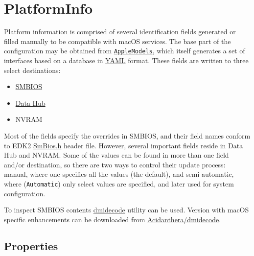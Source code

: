 \documentclass[]{article}
\providecommand{\tightlist}{%
  \setlength{\itemsep}{0pt}\setlength{\parskip}{0pt}}
\begin{document}
\section{PlatformInfo}\label{platforminfo}

Platform information is comprised of several identification fields
generated or filled manually to be compatible with macOS services. The
base part of the configuration may be obtained from
\href{https://github.com/acidanthera/OpenCorePkg/blob/master/AppleModels}{\texttt{AppleModels}},
which itself generates a set of interfaces based on a database
in \href{https://yaml.org/spec/1.2/spec.html}{YAML} format. These fields
are written to three select destinations:

\begin{itemize}
\tightlist
\item
  \href{https://www.dmtf.org/standards/smbios}{SMBIOS}
\item
  \href{https://github.com/acidanthera/OpenCorePkg/blob/master/Include/Intel/Protocol/DataHub.h}{Data
  Hub}
\item
  NVRAM
\end{itemize}

Most of the fields specify the overrides in SMBIOS, and their field
names conform to EDK2
\href{https://github.com/acidanthera/audk/blob/master/MdePkg/Include/IndustryStandard/SmBios.h}{SmBios.h}
header file. However, several important fields reside in Data Hub and
NVRAM. Some of the values can be found in more than one field and/or
destination, so there are two ways to control their update process:
manual, where one specifies all the values (the default), and semi-automatic,
where (\texttt{Automatic}) only select values are specified, and later used
for system configuration.

To inspect SMBIOS contents \href{http://www.nongnu.org/dmidecode}{dmidecode} utility can
be used. Version with macOS specific enhancements can be downloaded from
\href{https://github.com/acidanthera/dmidecode/releases}{Acidanthera/dmidecode}.

\subsection{Properties}\label{platforminfoprops}
\end{document}
